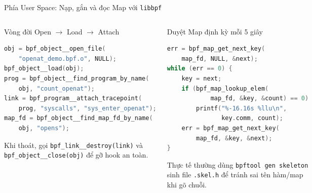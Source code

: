 \begin{frame}[fragile]{Phía User Space: Nạp, gắn và đọc Map với \texttt{libbpf}}
  \begin{columns}[T,onlytextwidth]
    \begin{block}{Vòng đời Open $\rightarrow$ Load $\rightarrow$ Attach}
\begin{lstlisting}[language=C,style=dense]
obj = bpf_object__open_file(
    "openat_demo.bpf.o", NULL);
bpf_object__load(obj);
prog = bpf_object__find_program_by_name(
    obj, "count_openat");
link = bpf_program__attach_tracepoint(
    prog, "syscalls", "sys_enter_openat");
map_fd = bpf_object__find_map_fd_by_name(
    obj, "opens");
\end{lstlisting}
      \footnotesize Khi thoát, gọi \texttt{bpf\_link\_\_destroy(link)} và \texttt{bpf\_object\_\_close(obj)} để gỡ hook an toàn.
    \end{block}

    \begin{block}{Duyệt Map định kỳ mỗi 5 giây}
\begin{lstlisting}[language=C,style=dense]
err = bpf_map_get_next_key(
    map_fd, NULL, &next);
while (err == 0) {
    key = next;
    if (bpf_map_lookup_elem(
            map_fd, &key, &count) == 0)
        printf("%-16.16s %llu\n",
               key.comm, count);
    err = bpf_map_get_next_key(
        map_fd, &key, &next);
}
\end{lstlisting}
      \footnotesize Thực tế thường dùng \texttt{bpftool gen skeleton} sinh file \texttt{.skel.h} để tránh sai tên hàm/map khi gõ chuỗi.
    \end{block}
  \end{columns}
\end{frame}

